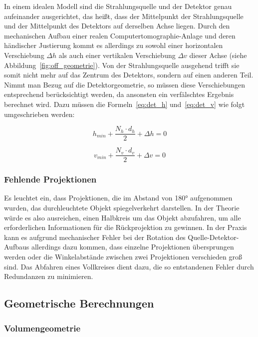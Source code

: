 In einem idealen Modell sind die Strahlungsquelle und der Detektor genau aufeinander ausgerichtet, das heißt, dass der
Mittelpunkt der Strahlungsquelle und der Mittelpunkt des Detektors auf derselben Achse liegen. Durch den mechanischen
Aufbau einer realen Computertomographie-Anlage und deren händischer Justierung kommt es allerdings zu sowohl
einer horizontalen Verschiebung $\Delta h$ als auch einer vertikalen Verschiebung $\Delta v$ dieser Achse (siehe
Abbildung~\ref{fig:off_geometrie}). Von der Strahlungsquelle ausgehend trifft sie somit nicht mehr auf das Zentrum des
Detektors, sondern auf einen anderen Teil. Nimmt man Bezug auf die Detektorgeometrie, so müssen diese Verschiebungen
entsprechend berücksichtigt werden, da ansonsten ein verfälschtes Ergebnis berechnet wird. Dazu müssen die
Formeln~\ref{eq:det_h} und~\ref{eq:det_v} wie folgt umgeschrieben werden:

\begin{equation} 
    h_{min} + \frac{N_h \cdot d_h}{2} + \Delta h = 0
\end{equation}

\begin{equation}
    v_{min} + \frac{N_v \cdot d_v}{2}  + \Delta v = 0
\end{equation}

\subsubsection{Fehlende Projektionen}

Es leuchtet ein, dass Projektionen, die im Abstand von 180° aufgenommen wurden, das durchleuchtete Objekt
spiegelverkehrt darstellen. In der Theorie würde es also ausreichen, einen Halbkreis um das Objekt abzufahren, um alle
erforderlichen Informationen für die Rückprojektion zu gewinnen. In der Praxis kann es aufgrund mechanischer Fehler bei
der Rotation des Quelle-Detektor-Aufbaus allerdings dazu kommen, dass einzelne Projektionen übersprungen werden oder die
Winkelabstände zwischen zwei Projektionen verschieden groß sind. Das Abfahren eines Vollkreises dient dazu, die so
entstandenen Fehler durch Redundanzen zu minimieren.

\subsection{Geometrische Berechnungen}\label{ssec:geometrie}

\subsubsection{Volumengeometrie}\label{sssec:vol_geometrie}

